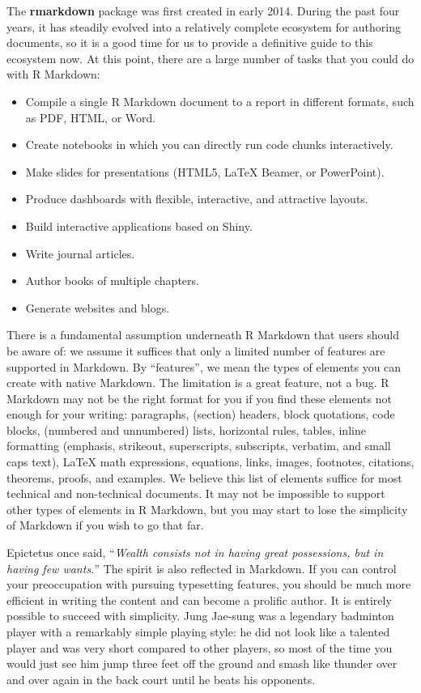 \documentclass[
  11pt,
]{krantz}
\theoremstyle{definition}
\theoremstyle{definition}
\theoremstyle{definition}
\theoremstyle{definition}
\theoremstyle{remark}
\begin{document}
The \textbf{rmarkdown} package \citep{R-rmarkdown} was first created in early 2014. During the past four years, it has steadily evolved into a relatively complete ecosystem for authoring documents, so it is a good time for us to provide a definitive guide to this ecosystem now. At this point, there are a large number of tasks that you could do with R Markdown:

\begin{itemize}
\item
  Compile a single R Markdown document to a report in different formats, such as PDF, HTML, or Word.
\item
  Create notebooks in which you can directly run code chunks interactively.
\item
  Make slides for presentations (HTML5, LaTeX Beamer, or PowerPoint).
\item
  Produce dashboards with flexible, interactive, and attractive layouts.
\item
  Build interactive applications based on Shiny.
\item
  Write journal articles.
\item
  Author books of multiple chapters.
\item
  Generate websites and blogs.
\end{itemize}

There is a fundamental assumption underneath R Markdown that users should be aware of: we assume it suffices that only a limited number of features are supported in Markdown. By ``features'', we mean the types of elements you can create with native Markdown. The limitation is a great feature, not a bug. R Markdown may not be the right format for you if you find these elements not enough for your writing: paragraphs, (section) headers, block quotations, code blocks, (numbered and unnumbered) lists, horizontal rules, tables, inline formatting (emphasis, strikeout, superscripts, subscripts, verbatim, and small caps text), LaTeX math expressions, equations, links, images, footnotes, citations, theorems, proofs, and examples. We believe this list of elements suffice for most technical and non-technical documents. It may not be impossible to support other types of elements in R Markdown, but you may start to lose the simplicity of Markdown if you wish to go that far.

Epictetus once said, ``\emph{Wealth consists not in having great possessions, but in having few wants.}'' The spirit is also reflected in Markdown. If you can control your preoccupation with pursuing typesetting features, you should be much more efficient in writing the content and can become a prolific author. It is entirely possible to succeed with simplicity. Jung Jae-sung was a legendary badminton player with a remarkably simple playing style: he did not look like a talented player and was very short compared to other players, so most of the time you would just see him jump three feet off the ground and smash like thunder over and over again in the back court until he beats his opponents.
\end{document}
